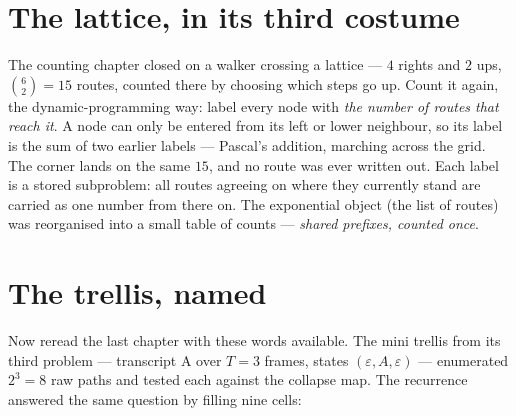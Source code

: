 \begin{narrative}
\section{The lattice, in its third costume}

The counting chapter closed on a walker crossing a lattice — $4$ rights
and $2$ ups, $\binom{6}{2} = 15$ routes, counted there by choosing
which steps go up. Count it again, the dynamic-programming way: label
every node with \emph{the number of routes that reach it}. A node can
only be entered from its left or lower neighbour, so its label is the
sum of two earlier labels — Pascal's addition, marching across the
grid. The corner lands on the same $15$, and no route was ever written
out. Each label is a stored subproblem: all routes agreeing on where
they currently stand are carried as one number from there on. The
exponential object (the list of routes) was reorganised into a small
table of counts — \emph{shared prefixes, counted once}.

\section{The trellis, named}

Now reread the last chapter with these words available. The mini
trellis from its third problem — transcript A over $T = 3$ frames,
states $(\varepsilon, A, \varepsilon)$ — enumerated $2^3 = 8$ raw paths
and tested each against the collapse map. The recurrence answered the
same question by filling nine cells:

\begin{center}
\end{center}


\end{narrative}
